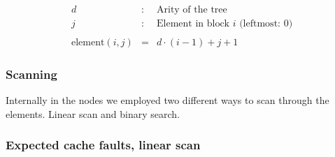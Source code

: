 \begin{eqnarray*}
d & : & \textrm{Arity of the tree} \\
j & : & \textrm{Element in block $i$ (leftmost: $0$)} \\
\\
\mathrm{element}(i, j) & = & d\cdot (i - 1) + j + 1
\end{eqnarray*}

\subsubsection*{Scanning}

Internally in the nodes we employed two different ways to scan through the elements. Linear scan and binary search.

\subsubsection*{Expected cache faults, linear scan}

